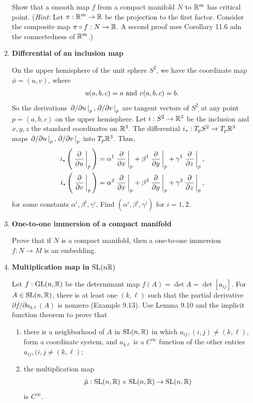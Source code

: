 \documentclass[12pt,a4paper]{report}
\begin{document}
\begin{enumerate}[label=11.\arabic*.]
Show that a smooth map $f$ from a compact manifold $N$ to $\mathbb{R}^m$ has critical point.  (\textit{Hint}: Let $\pi:\mathbb{R}^m \to \mathbb{R}$ be the projection to the first factor.  Consider the composite map $\pi \circ f: N \to \mathbb{R}$.  A second proof uses Corollary 11.6 adn the connectedness of $\mathbb{R}^m$.)

\item \textbf{Differential of an inclusion map}

On the upper hemisphere of the unit sphere $S^2$, we have the coordinate map $\phi =(u,v)$, where
\begin{align*}
	u(a,b,c)=a \text{ and } v(a,b,c)=b.
\end{align*}So the derivations $\left . \partial/\partial u \, \right |_p, \left . \partial/\partial v \, \right |_p$ are tangent vectors of $S^2$ at any point $p=(a,b,c)$ on the upper hemisphere.  Let $i: S^2\to \mathbb{R}^3$ be the inclusion and $x,y,z$ the standard coordinates on $\mathbb{R}^3$.  The differential $i_*:T_pS^2\to T_p\mathbb{R}^3$ maps $\left . \partial/\partial u \, \right |_p, \left . \partial/\partial v \, \right |_p$ into $T_p\mathbb{R}^3$.  Thus,
\begin{align*}
	i_*\left (\, \left . \frac{\partial }{\partial u} \, \right |_p \,\right ) &= \alpha^1\left . \frac{\partial }{\partial x} \, \right |_p+\beta^1\left . \frac{\partial }{\partial y} \, \right |_p+\gamma^1\left . \frac{\partial }{\partial z} \, \right |_p,\\
	i_*\left (\, \left . \frac{\partial }{\partial v} \, \right |_p \,\right ) &= \alpha^2\left . \frac{\partial }{\partial x} \, \right |_p+\beta^2\left . \frac{\partial }{\partial y} \, \right |_p+\gamma^2\left . \frac{\partial }{\partial z} \, \right |_p,
\end{align*}for some constants $\alpha^i,\beta^i, \gamma^i$.  Find $(\alpha^i,\beta^i, \gamma^i)$ for $i=1,2$.

\item \textbf{One-to-one immersion of a compact manifold}

Prove that if $N$ is a compact manifold, then a one-to-one immersion $f:N\to M$ is an embedding.

\newcommand{\SL}{\operatorname{SL}}
\newcommand{\GL}{\operatorname{GL}}
\item \textbf{Multiplication map in $\SL(n\R)$}

Let $f: \GL(n,\R)$ be the determinant map $f(A)=\det A=\det[a_{ij}]$.  For $A \in \SL(n,\R)$, there is at least one $(k,\ell)$ such that the partial derivative $\partial f/\partial a_{k\ell}(A)$ is nonzero (Example 9.13).  Use Lemma 9.10 and the implicit function theorem to prove that
\begin{enumerate}
	\item there is a neighborhood of $A$ in $\SL(n,\R)$ in which $a_{ij}, (i,j) \ne (k,\ell)$, form a coordinate system, and $a_{k\ell}$ is a $C^\infty$ function of the other entries $a_{ij},(i,j \ne (k,\ell);$
	\item the multiplication map
	\begin{align*}
		\hat{\mu}: \SL(n,\R)\times \SL(n,\R) \to \SL(n,\R)
	\end{align*}is $C^\infty$.
\end{enumerate}

\end{enumerate}
\end{document}
